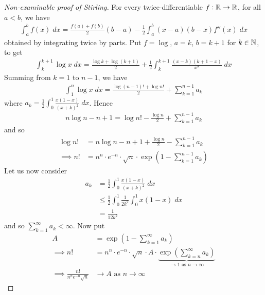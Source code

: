 \documentclass{../../template/note}
\begin{document}
    \begin{proof}[Non-examinable proof of Stirling]
        For every twice-differentiable \(f: \mathbb R \to \mathbb R\), for all \(a < b\), we have
        \begin{align*}
            \int_a^b f(x) \; dx = \frac{f(a) + f(b)}{2}(b-a) - \frac{1}{2} \int_a^b (x-a)(b-x)f''(x) \; dx
        \end{align*}
        obtained by integrating twice by parts. Put \(f = \log\), \(a = k\), \(b = k+1\) for \(k \in \mathbb N\), to get
        \begin{align*}
            \int_k^{k+1} \log x \; dx = \frac{\log k + \log(k+1)}{2} + \frac{1}{2} \int_{k}^{k+1} \frac{(x-k)(k+1-x)}{x^2} \; dx
        \end{align*}
        Summing from \(k=1\) to \(n-1\), we have
        \begin{align*}
            \int_1^n \log x \; dx = \frac{\log(n-1)! + \log n!}{2} + \sum_{k=1}^{n-1} a_k
        \end{align*}
        where \(a_k = \frac 1 2 \int_0^1 \frac{x(1-x)}{(x+k)^2} \; dx\). Hence
        \begin{align*}
            n \log n - n + 1 = \log n! - \frac{\log n}{2} + \sum_{k=1}^{n-1} a_k
        \end{align*}
        and so
        \begin{align*}
            \log n! &= n \log n - n + 1 + \frac{\log n}{2} - \sum_{k=1}^{n-1} a_k \\
            \implies n! &= n^n \cdot e^{-n} \cdot \sqrt{n} \cdot \exp\left(1-\sum_{k=1}^{n-1} a_k\right)
        \end{align*}
        Let us now consider
        \begin{align*}
            a_k &= \frac{1}{2} \int_0^1 \frac{x(1-x)}{(x+k)^2} \; dx \\
            &\leq \frac{1}{2} \int_0^1 \frac{1}{2k^2} \int_0^1 x(1-x) \; dx \\
            &= \frac{1}{12k^2}
        \end{align*}
        and so \(\sum_{k=1}^\infty a_k < \infty\). Now put
        \begin{align*}
            A &= \exp\left(1 - \sum_{k=1}^\infty a_k\right) \\
            \implies n! &= n^n \cdot e^{-n} \cdot \sqrt{n} \cdot A \cdot \underbrace{\exp\left(\sum_{k=n}^\infty a_k\right)}_{\to 1 \text{ as } n \to \infty} \\
            \implies \frac{n!}{n^ne^{-n}\sqrt{n}} &\to A \text{ as } n \to \infty

\end{align*}
\end{proof}
\end{document}
